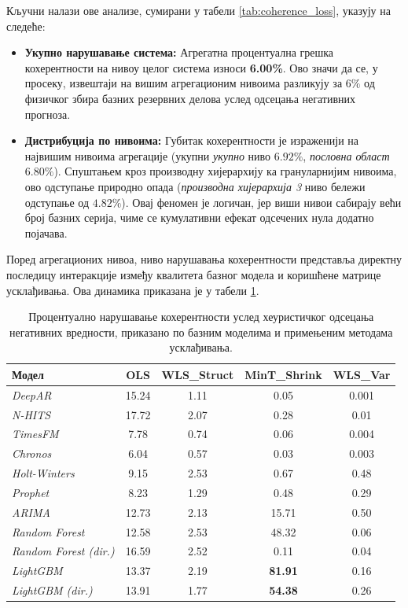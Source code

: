 \documentclass[12pt,oneside]{memoir}
\begin{document}
Кључни налази ове анализе, сумирани у табели \ref{tab:coherence_loss}, указују на следеће:
\begin{itemize}
    \item \textbf{Укупно нарушавање система:} Агрегатна процентуална грешка кохерентности на нивоу целог система износи \textbf{6.00\%}. Ово значи да се, у просеку, извештаји на вишим агрегационим нивоима разликују за $6\%$ од физичког збира базних резервних делова услед одсецања негативних прогноза.
    
    \item \textbf{Дистрибуција по нивоима:} Губитак кохерентности је израженији на највишим нивоима агрегације (укупни \textit{укупно} ниво $6.92\%$, \textit{пословна област} $6.80\%$). Спуштањем кроз производну хијерархију ка грануларнијим нивоима, ово одступање природно опада (\textit{производна хијерархија 3} ниво бележи одступање од $4.82\%$). Овај феномен је логичан, јер виши нивои сабирају већи број базних серија, чиме се кумулативни ефекат одсечених нула додатно појачава.
\end{itemize}

Поред агрегационих нивоа, ниво нарушавања кохерентности представља директну последицу интеракције између квалитета базног модела и коришћене матрице усклађивања. Ова динамика приказана је у табели \ref{tab:coherence_models_methods}.

\begin{table}[htbp]
    \centering
    \caption{Процентуално нарушавање кохерентности услед хеуристичког одсецања негативних вредности, приказано по базним моделима и примењеним методама усклађивања.}
    \label{tab:coherence_models_methods}
    \vspace{0.5em}
    \begin{tabular}{l c c c c}
        \toprule
        \textbf{Модел} & \textbf{OLS} & \textbf{WLS\_Struct} & \textbf{MinT\_Shrink} & \textbf{WLS\_Var} \\
        \midrule
        \textit{DeepAR} & 15.24 & 1.11 & 0.05 & 0.001 \\
        \textit{N-HITS} & 17.72 & 2.07 & 0.28 & 0.01 \\
        \textit{TimesFM} & 7.78 & 0.74 & 0.06 & 0.004 \\
        \textit{Chronos} & 6.04 & 0.57 & 0.03 & 0.003 \\
        \textit{Holt-Winters} & 9.15 & 2.53 & 0.67 & 0.48 \\
        \textit{Prophet} & 8.23 & 1.29 & 0.48 & 0.29 \\
        \textit{ARIMA} & 12.73 & 2.13 & 15.71 & 0.50 \\
        \textit{Random Forest} & 12.58 & 2.53 & 48.32 & 0.06 \\
        \textit{Random Forest (dir.)} & 16.59 & 2.52 & 0.11 & 0.04 \\
        \textit{LightGBM} & 13.37 & 2.19 & \textbf{81.91} & 0.16 \\
        \textit{LightGBM (dir.)} & 13.91 & 1.77 & \textbf{54.38} & 0.26 \\
        \bottomrule
    \end{tabular}
\end{table}
\end{document}
